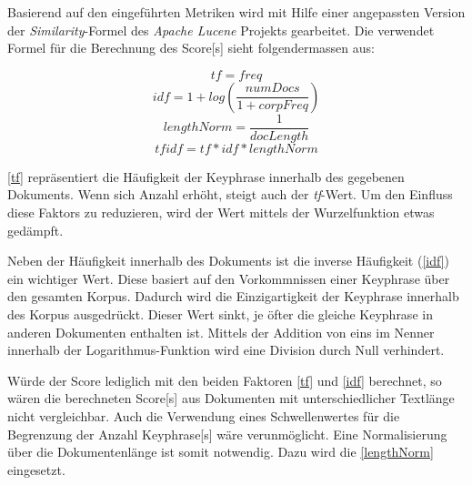 Basierend auf den eingeführten Metriken wird mit Hilfe einer angepassten Version der \textit{Similarity}-Formel\footnotemark {} des \textit{Apache Lucene} Projekts gearbeitet. Die verwendet Formel für die Berechnung des \gls{Score}[s] sieht folgendermassen aus:

\begin{equation}\label{tf}
tf = freq
\end{equation}
\begin{equation}\label{idf}
idf  =  1 +log( \frac{numDocs}{1 + corpFreq})
\end{equation}
\begin{equation}\label{lengthNorm}
lengthNorm =\frac{1}{docLength} 
\end{equation}
\begin{equation}\label{tfidf}
tfidf = tf * idf * lengthNorm
\end{equation}

\autoref{tf} repräsentiert die Häufigkeit der \gls{Keyphrase} innerhalb des gegebenen Dokuments. Wenn sich Anzahl erhöht, steigt auch der \textit{tf}-Wert. Um den Einfluss diese Faktors zu reduzieren, wird der Wert mittels der Wurzelfunktion etwas gedämpft.

Neben der Häufigkeit innerhalb des Dokuments ist die inverse Häu\-fig\-keit (\autoref{idf}) ein wichtiger Wert. Diese basiert auf den Vorkommnissen einer \gls{Keyphrase} über den gesamten Korpus. Dadurch wird die Einzigartigkeit der \gls{Keyphrase} innerhalb des Korpus ausgedrückt. Dieser Wert sinkt, je öfter die gleiche \gls{Keyphrase} in anderen Dokumenten enthalten ist. Mittels der Addition von eins im Nenner innerhalb der Logarithmus-Funktion wird eine Division durch Null verhindert. 



Würde der \gls{Score} lediglich mit den beiden Faktoren \autoref{tf} und \autoref{idf} berechnet, so wären die berechneten \gls{Score}[s] aus Dokumenten mit unterschiedlicher Textlänge nicht vergleichbar. Auch die Verwendung eines Schwellenwertes für die Begrenzung der Anzahl \gls{Keyphrase}[s] wäre verunmöglicht. Eine Normalisierung über die Dokumentenlänge ist somit notwendig. Dazu wird die \autoref{lengthNorm} eingesetzt.

